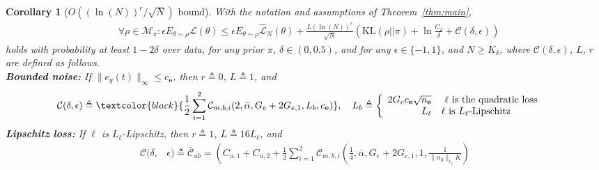 \documentclass{article}
\def\rve{{\mathbf{e}}}
\newcommand{\KL}{\mathrm{KL}}
\renewcommand{\KL}{\mathrm{KL}}
\newtheorem{corollary}[theorem]{Corollary}
\begin{document}
 \begin{corollary}[$O((\ln(N))^r/\sqrt{N})$ bound]
\label{thm:bounded:alt:col}
With the notation and assumptions of Theorem~\ref{thm:main}, 
\begin{equation}
\label{catoni1}
\begin{split}
  & \forall \rho \in\mathcal{M}_\pi: \epsilon E_{\theta \sim \rho } \mathcal{L}(\theta) \leq \epsilon E_{\theta\sim \rho } \hat{\mathcal{L}}_N(\theta)+  \frac{L(\ln(N))^{r}}{\sqrt{N}}\left(\KL(\rho ||\pi)+\ln\frac{C_{\delta}}{\delta} + 
  \mathcal{C}(\delta,\epsilon) \right)
\end{split}
\end{equation}
holds with probability at least $1-2\delta$ over data, 
for any prior $\pi$, $\delta \in (0,0.5)$, and for any $\epsilon \in \{-1,1\}$, and $N \ge K_{\delta}$, 
where %
$\mathcal{C}(\delta,\epsilon)$, $L$, $r$ are defined as follows.
\\
\textbf{Bounded noise:}
  If $\|e_g(t)\|_{\infty} \le c_{\rve}$, then %
      $r\triangleq 0$, $L \triangleq 1$, and 
\begin{equation*}
\begin{split}
   & \mathcal{C}(\delta,\epsilon) \triangleq \textcolor{black}{\frac{1}{2} \sum_{i=1}^2 \mathcal{C}_{m,b,i}(2,\bar{\alpha},G_e+2G_{e,1},L_b,c_{\rve})}, \quad 
    L_b \triangleq \left\{\begin{array}{rl} 2 G_ec_{\rve}\sqrt{n_{\rve}} & \mbox{ $\ell$ is the quadratic loss} \\
              L_{\ell} & \mbox{$\ell$ is $L_\ell$-Lipschitz }
         \end{array}\right. 
\end{split}
\end{equation*}
\textbf{Lipschitz loss:}
If $\ell$ is $L_{\ell}$-Lipschitz, then %
       $r \triangleq 1$, $L \triangleq 16L_{\ell}$, and 
\begin{equation*}
\begin{split}
   \mathcal{C}(\delta,& \epsilon)  \triangleq \mathcal{\bar{C}}_{ub}=\left(
        C_{u,1}+C_{u,2} %
   +  
    \frac{1}{2} \sum_{i=1}^2 \mathcal{C}_{m,b,i}\left(\frac{1}{4},\bar{\alpha},G_e+2G_{e,1},1,\frac{1}{\|\alpha_g\|_{\ell_1}K}\right)

\end{split}
\end{equation*}
\end{corollary}
\end{document}
